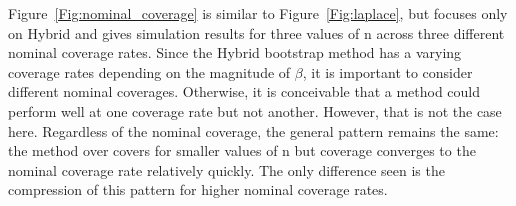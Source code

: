 \begin{appendices}
Figure~\ref{Fig:nominal_coverage} is similar to Figure~\ref{Fig:laplace}, but focuses only on Hybrid and gives simulation results for three values of n across three different nominal coverage rates. Since the Hybrid bootstrap method has a varying coverage rates depending on the magnitude of $\beta$, it is important to consider different nominal coverages. Otherwise, it is conceivable that a method could perform well at one coverage rate but not another. However, that is not the case here. Regardless of the nominal coverage, the general pattern remains the same: the method over covers for smaller values of n but coverage converges to the nominal coverage rate relatively quickly. The only difference seen is the compression of this pattern for higher nominal coverage rates.

\end{appendices}
